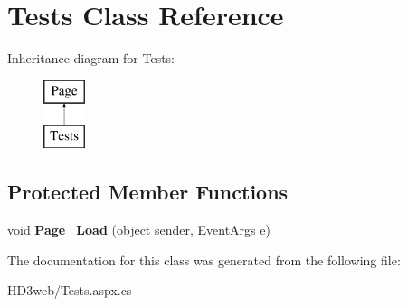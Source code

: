 \hypertarget{class_tests}{\section{Tests Class Reference}
\label{class_tests}
}
Inheritance diagram for Tests\+:\begin{figure}[H]
\begin{center}
\leavevmode
\includegraphics[height=2.000000cm]{class_tests}
\end{center}
\end{figure}
\subsection*{Protected Member Functions}
\begin{DoxyCompactItemize}
\item 
\hypertarget{class_tests_a98f2bec73f2c156815e27033d766b84d}{void {\bfseries Page\+\_\+\+Load} (object sender, Event\+Args e)}\label{class_tests_a98f2bec73f2c156815e27033d766b84d}

\end{DoxyCompactItemize}


The documentation for this class was generated from the following file\+:\begin{DoxyCompactItemize}
\item 
H\+D3web/Tests.\+aspx.\+cs\end{DoxyCompactItemize}
